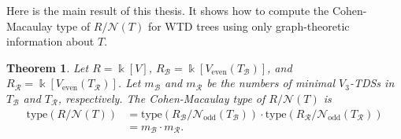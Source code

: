 \documentclass[12pt, reqno]{amsart}
\theoremstyle{definition}
\theoremstyle{plain}
\newtheorem{theorem}{Theorem}[subsection]
\theoremstyle{definition}
\newcommand{\tp}{\mbox{type}}
\newcommand{\R}{\mathcal{R}}
\newcommand{\B}{\mathcal{B}}
\newcommand{\kk}{\Bbbk}
\newcommand{\NN}{\mathcal{N}}
\begin{document}
Here is the main result of this thesis.
It shows how to compute the Cohen-Macaulay type of $R/\NN(T)$ for WTD trees using only graph-theoretic information about $T$.

\begin{theorem}\label{thm. CM type of WTD trees}
    Let $R = \kk[V]$, $R_\B = \kk[V_{\text{even}}(T_\B)]$, and $R_\R = \kk[V_{\text{even}}(T_\R)]$.
    Let $m_\B$ and $m_\R$ be the numbers of minimal $V_3$-TDSs in $T_\B$ and $T_\R$, respectively.
    The Cohen-Macaulay type of $R/\NN(T)$ is
    \begin{align*}
        \tp(R/\NN(T)) &= \tp(R_\B/\NN_{\text{odd}}(T_\B)) \cdot \tp(R_\R/\NN_{\text{odd}}(T_\R))\\
            &= m_\B \cdot m_\R.
    \end{align*}
\end{theorem}
\end{document}
